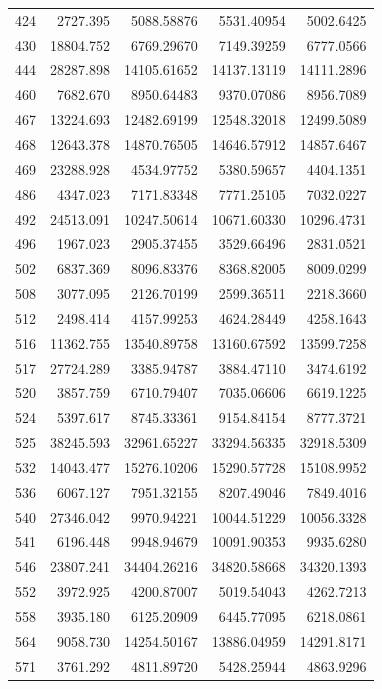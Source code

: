 \documentclass[
  12pt,
]{article}
\begin{document}
\begin{longtable}[]{@{}lrrrr@{}}
424 & 2727.395 & 5088.58876 & 5531.40954 & 5002.6425 \\
430 & 18804.752 & 6769.29670 & 7149.39259 & 6777.0566 \\
444 & 28287.898 & 14105.61652 & 14137.13119 & 14111.2896 \\
460 & 7682.670 & 8950.64483 & 9370.07086 & 8956.7089 \\
467 & 13224.693 & 12482.69199 & 12548.32018 & 12499.5089 \\
468 & 12643.378 & 14870.76505 & 14646.57912 & 14857.6467 \\
469 & 23288.928 & 4534.97752 & 5380.59657 & 4404.1351 \\
486 & 4347.023 & 7171.83348 & 7771.25105 & 7032.0227 \\
492 & 24513.091 & 10247.50614 & 10671.60330 & 10296.4731 \\
496 & 1967.023 & 2905.37455 & 3529.66496 & 2831.0521 \\
502 & 6837.369 & 8096.83376 & 8368.82005 & 8009.0299 \\
508 & 3077.095 & 2126.70199 & 2599.36511 & 2218.3660 \\
512 & 2498.414 & 4157.99253 & 4624.28449 & 4258.1643 \\
516 & 11362.755 & 13540.89758 & 13160.67592 & 13599.7258 \\
517 & 27724.289 & 3385.94787 & 3884.47110 & 3474.6192 \\
520 & 3857.759 & 6710.79407 & 7035.06606 & 6619.1225 \\
524 & 5397.617 & 8745.33361 & 9154.84154 & 8777.3721 \\
525 & 38245.593 & 32961.65227 & 33294.56335 & 32918.5309 \\
532 & 14043.477 & 15276.10206 & 15290.57728 & 15108.9952 \\
536 & 6067.127 & 7951.32155 & 8207.49046 & 7849.4016 \\
540 & 27346.042 & 9970.94221 & 10044.51229 & 10056.3328 \\
541 & 6196.448 & 9948.94679 & 10091.90353 & 9935.6280 \\
546 & 23807.241 & 34404.26216 & 34820.58668 & 34320.1393 \\
552 & 3972.925 & 4200.87007 & 5019.54043 & 4262.7213 \\
558 & 3935.180 & 6125.20909 & 6445.77095 & 6218.0861 \\
564 & 9058.730 & 14254.50167 & 13886.04959 & 14291.8171 \\
571 & 3761.292 & 4811.89720 & 5428.25944 & 4863.9296 \\

\end{longtable}
\end{document}
